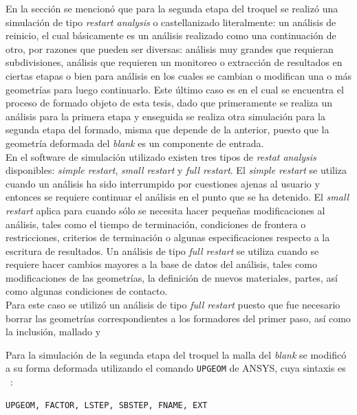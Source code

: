 En la sección \label{consideraciones-generales} se mencionó que para la segunda etapa del troquel se realizó 
una simulación de tipo \textit{restart analysis} o castellanizado literalmente: un análisis de reinicio, el cual 
básicamente es un análisis realizado como una continuación de otro, por razones que pueden ser diversas: 
análisis muy grandes que requieran subdivisiones, análisis que requieren un monitoreo o extracción de resultados 
en ciertas etapas o bien para análisis en los cuales se cambian o modifican una o más geometrías para luego 
continuarlo. Este último caso es en el cual se encuentra el proceso de formado objeto de esta tesis, dado 
que primeramente se realiza un análisis para la primera etapa y enseguida se realiza otra simulación para 
la segunda etapa del formado, misma que depende de la anterior, puesto que la geometría deformada del \textit{blank} 
es un componente de entrada.\\

En el software de simulación utilizado existen tres tipos de \textit{restat analysis} disponibles: \textit{simple restart}, 
\textit{small restart} y \textit{full restart}. El \textit{simple restart} se utiliza cuando un análisis ha sido 
interrumpido por cuestiones ajenas al usuario y entonces se requiere continuar el análisis en el punto que 
se ha detenido. El \textit{small restart} aplica para cuando sólo se necesita hacer pequeñas modificaciones al 
análisis, tales como el tiempo de terminación, condiciones de frontera o restricciones, criterios de terminación o algunas 
especificaciones respecto a la escritura de resultados. Un análisis de tipo \textit{full restart} se utiliza 
cuando se requiere hacer cambios mayores a la base de datos del análisis, tales como modificaciones de las geometrías, 
la definición de nuevos materiales, partes, así como algunas condiciones de contacto.\\

Para este caso se utilizó un análisis de tipo \textit{full restart} puesto que fue necesario borrar las geometrías 
correspondientes a los formadores del primer paso, así como la inclusión, mallado y 

Para la simulación de la segunda etapa del troquel la malla del \textit{blank} se modificó a su forma deformada 
utilizando el comando \texttt{UPGEOM} de ANSYS\faCopyright, cuya sintaxis es ~\cite{ansys-command}:

\begin{verbatim}
UPGEOM, FACTOR, LSTEP, SBSTEP, FNAME, EXT
\end{verbatim}

